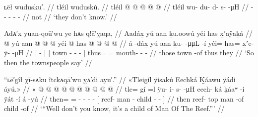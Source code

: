 \ex\label{ex:106-46-dont-know}%
%
\begingl
	\glpreamble	ʟēł wudusku′. //
	\glpreamble	tléil wuduskú. //
	\gla	tléil  @ {} @ {} @ {} @ {} @ {} //
	\glb	tléil wu- du- d- s-  -μH //
	\glc	{} - - - -  - //
	\gld	not  {} {} {} {} {} //
	\glft	‘they don’t know.’
		//
\endgl
\xe

\ex\label{ex:106-47-then-townspeople-say}%
%
\begingl
	\glpreamble	Adᴀ′x yuan-qoū′wu ye hᴀs q!ā′ỵaqa, //
	\glpreamble	Aadáx̱ yú aan ḵu.oowú yéi has x̱ʼaÿaḵá //
	\gla	{}  @ {} {}
		{} yú aan  @ {} @ {} @ {} {}
		yéi @ has @  @ {} @ {} @ {} //
	\glb	{} á -dáx̱ {}
		{} yú aan ḵu-  -μμL -í {}
		yéi= has= x̱ʼe- ÿ-  -μH //
	\glc	{}[  - {}]
		{}[  town -  - - {}]
		thus= = mouth- -  - //
	\gld	{}  {} {}
		{} those town  {} {} -of {}
		thus they  {} {} {} //
	\glft	‘So then the townspeople say’
		//
\endgl
\xe


\ex\label{ex:106-48-doncha-know}%
%
\begingl
	\glpreamble	“ʟē′gîł ỵī-sᴀku îtckᴀqā′wu ỵᴀ′di ayu′.” //
	\glpreamble	«\!Tleigíl ÿisakú Eechká Ḵáawu ÿádi áyú.\!» //
	\gla	«\! @ {} @ {}
		 @ {} @ {} @ {} @ {}
		{}  @ {}  @ {}  @ {}  @ {} {} //
	\glb	\pqp{}tle= gí =l 
		ÿu- i- s-  -μH
		{} eech- ká ḵáaʷ -í ÿát -í á -yú {} //
	\glc	\pqp{}then=  =
		- - -  -
		{}[ reef-  man - child -  - {}] //
	\gld	\pqp{}then  {}
		 {} {} {} {}
		{} reef- top man -of child -of  {} {} //
	\glft	‘“Well don’t you know, it’s a child of Man Of The Reef.”’
		//
\endgl
\xe

